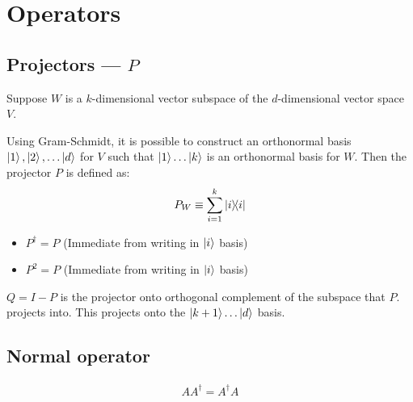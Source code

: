 \section{Operators}

\subsection{Projectors --- $P$}

Suppose $W$ is a $k$-dimensional vector subspace of the $d$-dimensional 
vector space $V$. 

Using Gram-Schmidt, it is possible to construct an orthonormal basis
$\ket{1}, \ket{2}, \dots \ket{d}$ for $V$ such that $\ket{1} \dots \ket{k}$
is an orthonormal basis for $W$. Then the projector $P$ is defined as:
\begin{align*}
    P_W \equiv \sum_{i=1}^k \ketbra{i}
\end{align*}

\begin{itemize}
\item $P^\dagger = P$ (Immediate from writing in $\ket{i}$ basis)
\item $P^2 = P$ (Immediate from writing in $\ket{i}$ basis)
\end{itemize}

$Q = I - P$ is the projector onto orthogonal complement of the subspace that $P$.
projects into. This projects onto the $\ket{k+1} \dots \ket{d}$ basis.

\subsection{Normal operator}
\begin{align*} A A^\dagger = A^\dagger A \end{align*}


